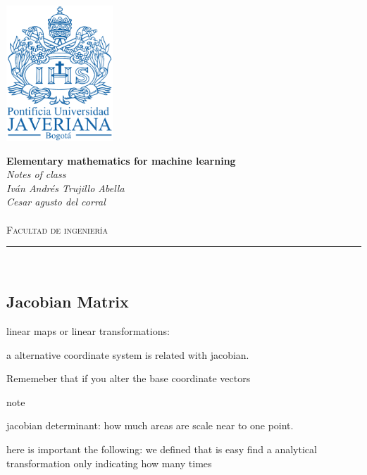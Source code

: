 \documentclass[10pt,a4paper]{article}
\author{Iván Andrés Trujillo }
\begin{document}
\newcommand{\HRule}{\rule{\linewidth}{0.5mm}}


\includegraphics[width = 4cm]{pujshield.eps}\\[0.5cm] 

\begin{center} 
\textbf{\LARGE Elementary mathematics for machine learning }\\[0.2cm]
\emph{\LARGE Notes of class}\\[0.3cm] 
\emph{Iván Andrés Trujillo Abella \\
Cesar agusto del corral } \\
\textsc{\Large 
}\\[0.2cm] 
\textsc{\large Facultad de ingeniería}\\[0.5cm] 
\HRule \\[0.4cm]
\end{center}
\vspace{1cm}



\subsection{Jacobian Matrix}

linear maps or linear transformations:



a alternative coordinate system is related with jacobian.

Rememeber that if you alter the base coordinate vectors



note 

jacobian determinant: how much areas are scale near to one point.




here is important the following:
we defined that is easy find a analytical transformation only indicating how many times 
\end{document}
